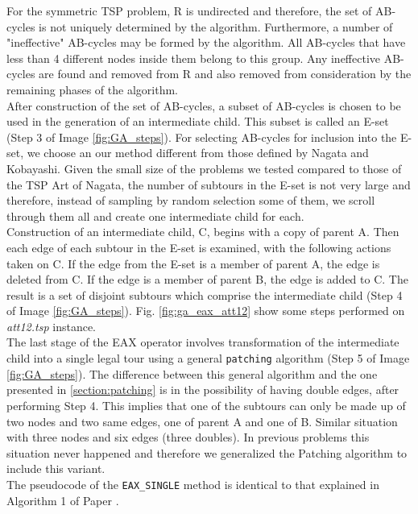 For the symmetric TSP problem, R is undirected and therefore, the set of AB-cycles is not uniquely determined by the algorithm. Furthermore, a number of "ineffective" AB-cycles may be formed by the algorithm. All AB-cycles that have less than 4 different nodes inside them belong to this group. Any ineffective AB-cycles are found and removed from R and also removed from consideration by the remaining phases of the algorithm.
\\
After construction of the set of AB-cycles, a subset of AB-cycles is chosen to be used in the generation of an intermediate child. This subset is called an E-set (Step 3 of Image \ref{fig:GA_steps}). For selecting AB-cycles for inclusion into the E-set, we choose an our method different from those defined by Nagata and Kobayashi. Given the small size of the problems we tested compared to those of the TSP Art of Nagata, the number of subtours in the E-set is not very large and therefore, instead of sampling by random selection some of them, we scroll through them all and create one intermediate child for each.
\\
Construction of an intermediate child, C, begins with a copy of parent A. Then each edge of each subtour in the E-set is examined, with the following actions taken on C. If the edge from the E-set is a member of parent A, the edge is deleted from C. If the edge is a member of parent B, the edge is added to C. The result is a set of disjoint subtours which comprise the intermediate child (Step 4 of Image \ref{fig:GA_steps}). Fig. \ref{fig:ga_eax_att12} show some steps performed on \textit{att12.tsp} instance. \\
The last stage of the EAX operator involves transformation of the intermediate child into a single legal tour using a general \texttt{patching} algorithm (Step 5 of Image \ref{fig:GA_steps}). The difference between this general algorithm and the one presented in \ref{section:patching} is in the possibility of having double edges, after performing Step 4. This implies that one of the subtours can only be made up of two nodes and two same edges, one of parent A and one of B. Similar situation with three nodes and six edges (three doubles). In previous problems this situation never happened and therefore we generalized the Patching algorithm to include this variant.\\ 
The pseudocode of the \texttt{EAX\_SINGLE} method is identical to that explained in Algorithm 1 of Paper \cite{Honda2013}.

